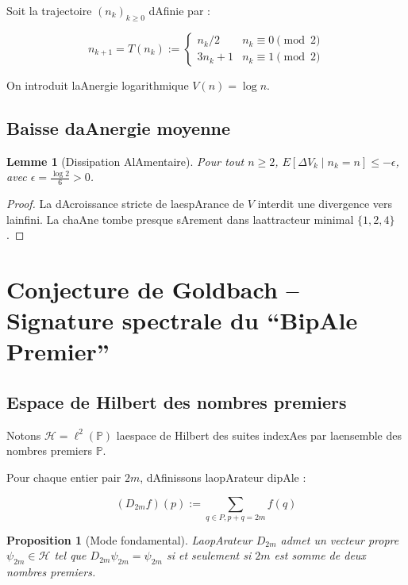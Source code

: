 \documentclass[12pt]{article}
\newtheorem{lemma}{Lemme}
\newtheorem{proposition}{Proposition}
\begin{document}
Soit la trajectoire $(n_k)_{k\ge 0}$ dAfinie par :

$$n_{k+1} = T(n_k) := \begin{cases} n_k/2 & n_k \equiv 0 \pmod 2 \\ 3n_k+1 & n_k \equiv 1 \pmod 2 \end{cases}$$



On introduit laAnergie logarithmique $V(n) = \log n$.



\subsection{Baisse daAnergie moyenne} 

\begin{lemma}[Dissipation AlAmentaire] 

Pour tout $n\ge 2$, $E[\Delta V_k \mid n_k = n] \le -\epsilon$, avec $\epsilon = \frac{\log 2}{6} > 0$.

\end{lemma}



\begin{proof}

La dAcroissance stricte de laespArance de $V$ interdit une divergence vers lainfini. La chaAne tombe presque sArement dans laattracteur minimal $\{1,2,4\}$.

\end{proof}



\section{Conjecture de Goldbach -- Signature spectrale du ``BipAle Premier''}



\subsection{Espace de Hilbert des nombres premiers} 

Notons $\mathcal H = \ell^2(\mathbb P)$ laespace de Hilbert des suites indexAes par laensemble des nombres premiers $\mathbb P$.

Pour chaque entier pair $2m$, dAfinissons laopArateur dipAle :

$$(D_{2m}f)(p) := \sum_{q \in P, p+q=2m} f(q)$$



\begin{proposition}[Mode fondamental] 

LaopArateur $D_{2m}$ admet un vecteur propre $\psi_{2m} \in \mathcal H$ tel que $D_{2m}\psi_{2m} = \psi_{2m}$ si et seulement si $2m$ est somme de deux nombres premiers.

\end{proposition}
\end{document}
